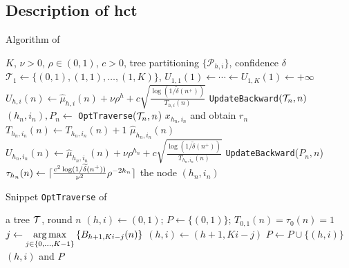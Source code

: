 \subsection{Description of \gls{hct}{}}
\begin{algorithm}[ht]
\centering
\caption{Algorithm of \HCT{}}
\label{alg:hct}
\begin{algorithmic}[1]
     $K$, $\nu>0$, $\rho\in(0,1)$, $c>0$, tree partitioning $\{\mathcal{P}_{h,i}\}$, confidence $\delta$
     $\mathcal{T}_1 \gets \{(0,1),(1,1),\ldots,(1,K)\}$, $U_{1,1}(1) \gets \cdots \gets U_{1,K}(1) \gets +\infty$
                \State $U_{h,i}(n) \gets \hat{\mu}_{h,i}(n) + \nu\rho^{h} + c\sqrt{\frac{\operatorname{log}\left(1/\tilde{\delta}(n^+)\right)}{T_{h,i}(n)}}$
            \EndFor
            \State \texttt{UpdateBackward}$(\mathcal{T}_n, n)$
        \EndIf
        \State $(h_n,i_n),P_n \gets$ \texttt{OptTraverse}($\mathcal{T}_n, n$)
        \State {} $x_{h_n,i_n}$ and obtain $r_n$
        \State $T_{h_n,i_n}(n) \gets T_{h_n,i_n}(n)+1$
        \State {} $\hat{\mu}_{h_n,i_n}(n)$
        \State $U_{h_n,i_n}(n) \gets \hat{\mu}_{h_n,i_n}(n) + \nu\rho^{h_n} + c\sqrt{\frac{\operatorname{log}\left(1/\tilde{\delta}(n^+)\right)}{T_{h_n,i_n}(n)}}$
        \State \texttt{UpdateBackward}($P_n, n$)
        \State $\tau_{h_n}(n) \gets \lceil\frac{c^2\operatorname{log}(1/\widetilde{\delta}(n^+))}{\nu^2}\rho^{-2h_n}\rceil$
            \State {} the node $(h_n,i_n)$
        \EndIf
    \EndFor
\end{algorithmic}
\end{algorithm}

\begin{algorithm}[ht]
\centering
\caption{Snippet \texttt{OptTraverse} of \HCT{}}
\label{alg:hct_opt}
\begin{algorithmic}[1]
     a tree $\mathcal{T}$, round $n$
     $(h,i)\leftarrow (0,1)$; $P\leftarrow \{(0,1)\}$; $T_{0,1}(n)=\tau_0(n)=1$
        \State $j \gets \underset{j\in\{0,\ldots,K-1\}}{\operatorname*{arg\,max}} \left\{B_{h+1,Ki-j}(n)\right\}$
        \State $(h,i) \gets (h+1,Ki-j)$
        \State $P\leftarrow P\cup\{(h,i)\}$
    \EndWhile
     $(h,i)$ and $P$
\end{algorithmic}
\end{algorithm}

